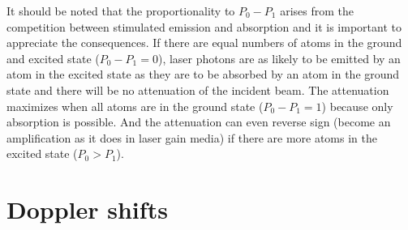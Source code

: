 It should be noted that the proportionality to \(P_0-P_1 \) arises from the 
competition between stimulated emission and absorption and it is important to 
appreciate the consequences. If there are equal numbers of atoms in the ground 
and excited state (\(P_0-P_1=0\)), laser photons are as likely to be emitted by 
an atom in the excited state as they are to be absorbed by an atom in the ground 
state and there will be no attenuation of the incident beam. The attenuation 
maximizes when all atoms are in the ground state (\(P_0-P_1=1\)) because only 
absorption is possible. And the attenuation can even reverse sign (become an 
amplification as it does in laser gain media) if there are more atoms in the 
excited state (\(P_0>P_1\)).

\section{Doppler shifts}  %


